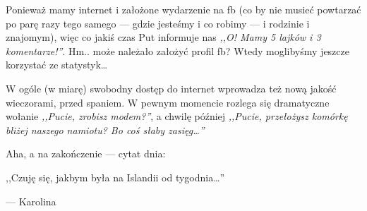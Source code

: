 
Ponieważ mamy internet i założone wydarzenie na fb (co by nie musieć powtarzać po parę razy tego samego --- gdzie jesteśmy i co robimy --- i rodzinie i znajomym), więc co jakiś czas Put informuje nas \emph{,,O! Mamy 5 lajków i 3 komentarze!''}. Hm.. może należało założyć profil fb? Wtedy moglibyśmy jeszcze korzystać ze statystyk…

W ogóle (w miarę) swobodny dostęp do internet wprowadza też nową jakość wieczorami, przed spaniem. W pewnym momencie rozlega się dramatyczne wołanie \emph{,,Pucie, zrobisz modem?''}, a chwilę później \emph{,,Pucie, przełożysz komórkę bliżej naszego namiotu? Bo coś słaby zasięg…''}

\vspace{16pt}

Aha, a na zakończenie --- cytat dnia:
\epigraph{,,Czuję się, jakbym była na Islandii od tygodnia…''}{--- \textup{Karolina}}

